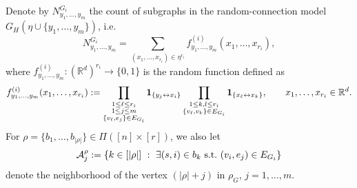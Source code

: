 \documentclass[12pt]{article}
\newcommand{\R}{\mathbb{R}}
\newcommand{\bone}{{\bf 1}}
\def\real{{\mathord{\mathbb R}}}
\numberwithin{equation}{section}
\begin{document}
\vspace{-0.4cm}
\noindent
Denote by $N_{y_1,\ldots , y_m}^{G_i}$ the count of subgraphs in
the random-connection model $G_H (\eta \cup \{y_1,\ldots , y_m \} )$,
i.e.
\begin{equation}
\nonumber
N_{y_1,\ldots , y_m}^{G_i}
=\sum_{(x_1, \ldots ,x_{r_i})\in\eta^{r_i}} f^{(i)}_{y_1,\ldots , y_m} (x_1, \ldots ,x_{r_i}), 
\end{equation}
 where
 $f^{(i)}_{y_1,\ldots , y_m} :(\real^d)^{r_i} \to \{0,1\}$ is the random function defined as 
\begin{equation}
\nonumber
f^{(i)}_{y_1,\ldots , y_m} (x_1, \ldots ,x_{r_i}):=
\prod_{  \substack{
    1 \leq \ell \leq r_i
    \\
    1 \leq j \leq m
    \\ \{v_\ell,e_j\}\in E_{G_i} }
}
\bone_{\{y_j\leftrightarrow x_i\}} 
\prod_{\substack{ 1 \leq k,l \leq r_i
    \\ \{v_\ell,v_k\}\in E_{G_i}}}\bone_{\{x_\ell\leftrightarrow x_k\}},
\qquad
 x_1,\ldots , x_{r_i} \in \R^d. 
\end{equation} 
 For $\rho = \{ b_1,\ldots , b_{|\rho |}\}
\in\Pi ([n]\times[r])$, we also let 
\begin{equation}
\nonumber
    {\cal A}^\rho_j:=\{ k \in [ |\rho | ] \ : \ \exists (s,i)\in b_k ~\mathrm{s.t.}~
    (v_i,e_j) \in E_{G_i} %
    \} 
\end{equation} 
denote the neighborhood of the vertex $(|\rho | + j)$ in $\rho_G$,
$j=1,\ldots , m$.
\end{document}
